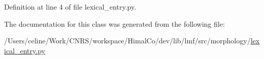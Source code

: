 Definition at line 4 of file lexical\+\_\+entry.\+py.



The documentation for this class was generated from the following file\+:\begin{DoxyCompactItemize}
\item 
/\+Users/celine/\+Work/\+C\+N\+R\+S/workspace/\+Himal\+Co/dev/lib/lmf/src/morphology/\hyperlink{morphology_2lexical__entry_8py}{lexical\+\_\+entry.\+py}\end{DoxyCompactItemize}
